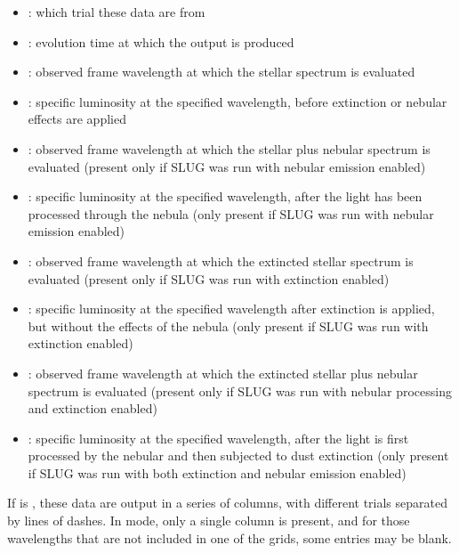 \documentclass[letterpaper,10pt,english]{sphinxmanual}
\begin{document}
\begin{itemize}
\item {} 
: which trial these data are from

\item {} 
: evolution time at which the output is produced

\item {} 
: observed frame wavelength at which the stellar spectrum is evaluated

\item {} 
: specific luminosity at the specified wavelength, before extinction or nebular effects are applied

\item {} 
: observed frame wavelength at which the stellar plus nebular spectrum is evaluated (present only if SLUG was run with nebular emission enabled)

\item {} 
: specific luminosity at the specified wavelength, after the light has been processed through the nebula (only present if SLUG was run with nebular emission enabled)

\item {} 
: observed frame wavelength at which the extincted stellar spectrum is evaluated (present only if SLUG was run with extinction enabled)

\item {} 
: specific luminosity at the specified wavelength after extinction is applied, but without the effects of the nebula (only present if SLUG was run with extinction enabled)

\item {} 
: observed frame wavelength at which the extincted stellar plus nebular spectrum is evaluated (present only if SLUG was run with nebular processing and  extinction enabled)

\item {} 
: specific luminosity at the specified wavelength, after the light is first processed by the nebular and then subjected to dust extinction (only present if SLUG was run with both extinction and nebular emission enabled)

\end{itemize}

If  is , these data are output in a series of columns, with different trials separated by lines of dashes. In  mode, only a single  column is present, and for those wavelengths that are not included in one of the grids, some entries may be blank.
\end{document}

